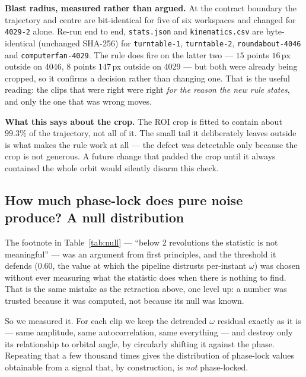 \documentclass[11pt,a4paper]{article}
\begin{document}
\textbf{Blast radius, measured rather than argued.} At the contract boundary the trajectory and
centre are bit-identical for five of six workspaces and changed for \texttt{4029-2} alone. Re-run
end to end, \texttt{stats.json} and \texttt{kinematics.csv} are byte-identical (unchanged SHA-256)
for \texttt{turntable-1}, \texttt{turntable-2}, \texttt{roundabout-4046} and
\texttt{computerfan-4029}. The rule does fire on the latter two --- $15$ points $16$\,px outside on
4046, $8$ points $147$\,px outside on 4029 --- but both were already being cropped, so it confirms
a decision rather than changing one. That is the useful reading: the clips that were right were
right \emph{for the reason the new rule states}, and only the one that was wrong moves.

\textbf{What this says about the crop.} The ROI crop is fitted to contain about $99.3\%$ of the
trajectory, not all of it. The small tail it deliberately leaves outside is what makes the rule
work at all --- the defect was detectable only because the crop is not generous. A future change
that padded the crop until it always contained the whole orbit would silently disarm this check.

\subsection{How much phase-lock does pure noise produce? A null distribution}
\label{sec:phaselocknull}

The footnote in Table~\ref{tab:null} --- ``below 2 revolutions the statistic is not meaningful''
--- was an argument from first principles, and the threshold it defends ($0.60$, the value at
which the pipeline distrusts per-instant $\omega$) was chosen without ever measuring what the
statistic does when there is nothing to find. That is the same mistake as the retraction above,
one level up: a number was trusted because it was computed, not because its null was known.

So we measured it. For each clip we keep the detrended $\omega$ residual exactly as it is ---
same amplitude, same autocorrelation, same everything --- and destroy only its relationship to
orbital angle, by circularly shifting it against the phase. Repeating that a few thousand times
gives the distribution of phase-lock values obtainable from a signal that, by construction, is
\emph{not} phase-locked.
\end{document}
